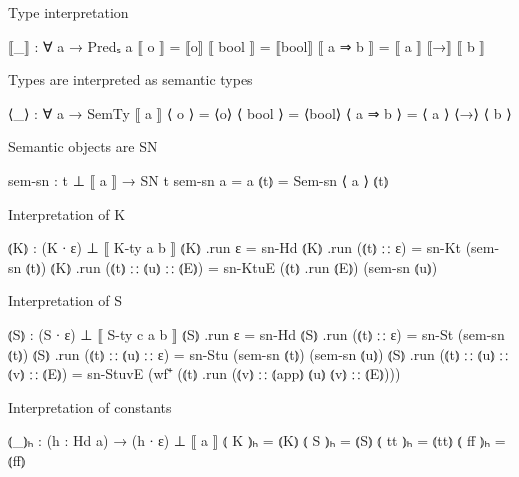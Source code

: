 
Type interpretation

\begin{code}
⟦_⟧ : ∀ a → Predₛ a
⟦ o ⟧      = ⟦o⟧
⟦ bool ⟧   = ⟦bool⟧
⟦ a ⇒ b ⟧  = ⟦ a ⟧ ⟦→⟧ ⟦ b ⟧
\end{code}

Types are interpreted as semantic types

\begin{code}
⟨_⟩ : ∀ a → SemTy ⟦ a ⟧
⟨ o     ⟩  = ⟨o⟩
⟨ bool  ⟩  = ⟨bool⟩
⟨ a ⇒ b ⟩  = ⟨ a ⟩ ⟨→⟩ ⟨ b ⟩
\end{code}

Semantic objects are SN

\begin{code}
sem-sn : t ⊥ ⟦ a ⟧ → SN t
sem-sn {a = a} ⦅t⦆ = Sem-sn ⟨ a ⟩ ⦅t⦆
\end{code}


Interpretation of K

\begin{code}
⦅K⦆ : (K ∙ ε) ⊥ ⟦ K-ty a b ⟧
⦅K⦆ .run ε                  = sn-Hd
⦅K⦆ .run (⦅t⦆ ∷ ε)          = sn-Kt (sem-sn ⦅t⦆)
⦅K⦆ .run (⦅t⦆ ∷ ⦅u⦆ ∷ ⦅E⦆)  = sn-KtuE (⦅t⦆ .run ⦅E⦆) (sem-sn ⦅u⦆)
\end{code}


Interpretation of S

\begin{code}
⦅S⦆ : (S ∙ ε) ⊥ ⟦ S-ty c a b ⟧
⦅S⦆ .run ε                        = sn-Hd
⦅S⦆ .run (⦅t⦆ ∷ ε)                = sn-St (sem-sn ⦅t⦆)
⦅S⦆ .run (⦅t⦆ ∷ ⦅u⦆ ∷ ε)          = sn-Stu (sem-sn ⦅t⦆) (sem-sn ⦅u⦆)
⦅S⦆ .run (⦅t⦆ ∷ ⦅u⦆ ∷ ⦅v⦆ ∷ ⦅E⦆)  = sn-StuvE (wf⁺ (⦅t⦆ .run (⦅v⦆ ∷ ⦅app⦆ ⦅u⦆ ⦅v⦆ ∷ ⦅E⦆)))
\end{code}


Interpretation of constants

\begin{code}
⦅_⦆ₕ : (h : Hd a) → (h ∙ ε) ⊥ ⟦ a ⟧
⦅ K ⦆ₕ   = ⦅K⦆
⦅ S ⦆ₕ   = ⦅S⦆
⦅ tt ⦆ₕ  = ⦅tt⦆
⦅ ff ⦆ₕ  = ⦅ff⦆
\end{code}

